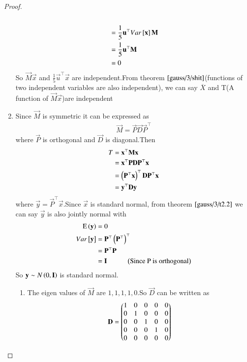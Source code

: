 \begin{proof}
\begin{enumerate}
\begin{multline}
\end{multline}
\begin{align}
    &=\frac{1}{5}\mathbf{u}^{\top}Var{}\left[\mathbf{x}\right]\mathbf{M}\\
    &=\frac{1}{5}\mathbf{u}^{\top}\mathbf{M}\\
    &=0
\end{align}
So $\vec{M}\vec{x}$ and $\frac{1}{5}\vec{u}^{\top}\vec{x}$ are independent.From theorem $\ref{gauss/3/shit}$(functions of two independent variables are also independent), we can say $\overline{X}$ and T(A function of $\vec{M}\vec{x}$)are independent
\item Since $\vec{M}$ is symmetric it can be expressed as
\begin{align}
    \vec{M}=\vec{P}\vec{D}\vec{P}^{\top}
\end{align}
where $\vec{P}$ is orthogonal and $\vec{D}$ is diagonal.Then
\begin{align}
    T&=\mathbf{x}^{\top}\mathbf{M}\mathbf{x}\\
    &=\mathbf{x}^{\top}\mathbf{P}\mathbf{D}\mathbf{P}^{\top}\mathbf{x}\\
    &=\left(\mathbf{P}^{\top}\mathbf{x}\right)^{\top}\mathbf{D}\mathbf{P}^{\top}\mathbf{x}\\
    &=\mathbf{y}^{\top}\mathbf{D}\mathbf{y}
\end{align}
where $\vec{y}=\vec{P}^{\top}\vec{x}$.Since $\vec{x}$ is standard normal, from theorem $\ref{gauss/3/t2.2}$ we can say $\vec{y}$ is also jointly normal with
\begin{align}
    \text{E}\left( \mathbf{y} \right)&=0\\
    Var{}\left[\mathbf{y}\right]&=\mathbf{P}^{\top}\left(\mathbf{P}^{\top}\right)^{\top}\\
    &=\mathbf{P}^{\top}\mathbf{P}\\
    &=\mathbf{I} \hspace{1cm} \left(\text{Since P is orthogonal}\right)
\end{align}
So $\mathbf{y}\sim N\left(0,\mathbf{I}\right)$ is standard normal.
\begin{enumerate}
    \item The eigen values of $\vec{M}$ are $1,1,1,1,0$.So $\vec{D}$ can be written as
    \begin{align}
        \mathbf{D}=\begin{pmatrix}1&0&0&0&0\\
                       0&1&0&0&0\\
                       0&0&1&0&0\\
                       0&0&0&1&0\\
                       0&0&0&0&0\end{pmatrix}
    \end{align}

\end{enumerate}
\end{enumerate}
\end{proof}
